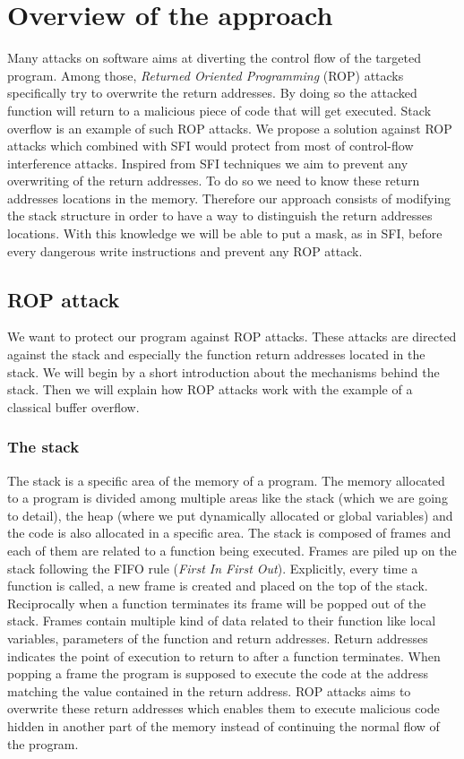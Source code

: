 \documentclass[11pt]{sdm}
\begin{document}
\section{Overview of the approach}
\label{sec:Overview of the approach}
	Many attacks on software aims at diverting the control flow of the targeted program. Among those, \textit{Returned Oriented Programming} (ROP) attacks specifically try to overwrite the return addresses.
By doing so the attacked function will return to a malicious piece of code that will get executed.
Stack overflow is an example of such ROP attacks.
We propose a solution against ROP attacks which combined with SFI would protect from most of control-flow interference attacks.
Inspired from SFI techniques we aim to prevent any overwriting of the return addresses. To do so we need to know these return addresses locations in the memory. Therefore our approach consists of modifying the stack structure in order to have a way to distinguish the return addresses locations. With this knowledge we will be able to put a mask, as in SFI, before every dangerous write instructions and prevent any ROP attack.

\subsection{ROP attack}
\label{sub:Issue}

	We want to protect our program against ROP attacks. These attacks are directed against the stack and especially the function return addresses located in the stack.
We will begin by a short introduction about the mechanisms behind the stack. Then we will explain how ROP attacks work with the example of a classical buffer overflow.

\subsubsection{The stack}
\label{ssub:The stack}
	The stack is a specific area of the memory of a program. The memory allocated to a program is divided among multiple areas like the stack (which we are going to detail), the heap (where we put dynamically allocated or global variables) and the code is also allocated in a specific area.
The stack is composed of frames and each of them are related to a function being executed. Frames are piled up on the stack following the FIFO rule (\textit{First In First Out}). Explicitly, every time a function is called, a new frame is created and placed on the top of the stack. Reciprocally when a function terminates its frame will be popped out of the stack.
Frames contain multiple kind of data related to their function like local variables, parameters of the function and return addresses. Return addresses indicates the point of execution to return to after a function terminates. When popping a frame the program is supposed to execute the code at the address matching the value contained in the return address.
ROP attacks aims to overwrite these return addresses which enables them to execute malicious code hidden in another part of the memory instead of continuing the normal flow of the program.
\end{document}
